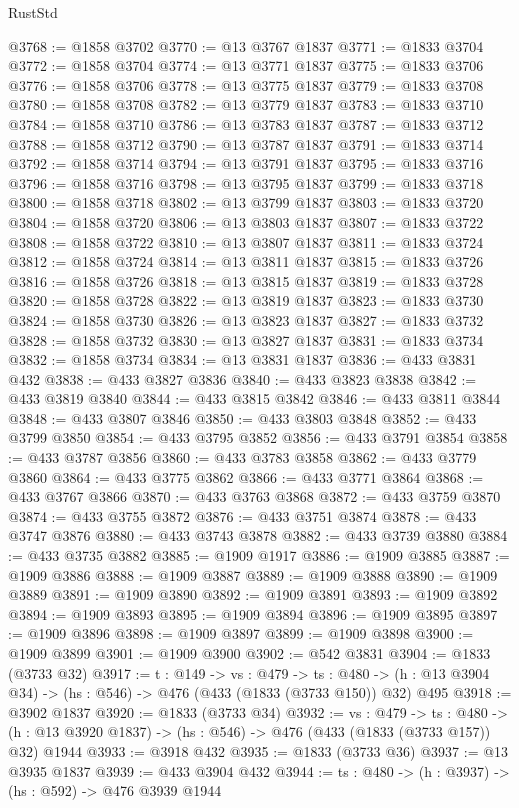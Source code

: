 \begin{lexlean}{RustStd}
\begin{coremodule}
@3768 := @1858 @3702
@3770 := @13 @3767 @1837
@3771 := @1833 @3704
@3772 := @1858 @3704
@3774 := @13 @3771 @1837
@3775 := @1833 @3706
@3776 := @1858 @3706
@3778 := @13 @3775 @1837
@3779 := @1833 @3708
@3780 := @1858 @3708
@3782 := @13 @3779 @1837
@3783 := @1833 @3710
@3784 := @1858 @3710
@3786 := @13 @3783 @1837
@3787 := @1833 @3712
@3788 := @1858 @3712
@3790 := @13 @3787 @1837
@3791 := @1833 @3714
@3792 := @1858 @3714
@3794 := @13 @3791 @1837
@3795 := @1833 @3716
@3796 := @1858 @3716
@3798 := @13 @3795 @1837
@3799 := @1833 @3718
@3800 := @1858 @3718
@3802 := @13 @3799 @1837
@3803 := @1833 @3720
@3804 := @1858 @3720
@3806 := @13 @3803 @1837
@3807 := @1833 @3722
@3808 := @1858 @3722
@3810 := @13 @3807 @1837
@3811 := @1833 @3724
@3812 := @1858 @3724
@3814 := @13 @3811 @1837
@3815 := @1833 @3726
@3816 := @1858 @3726
@3818 := @13 @3815 @1837
@3819 := @1833 @3728
@3820 := @1858 @3728
@3822 := @13 @3819 @1837
@3823 := @1833 @3730
@3824 := @1858 @3730
@3826 := @13 @3823 @1837
@3827 := @1833 @3732
@3828 := @1858 @3732
@3830 := @13 @3827 @1837
@3831 := @1833 @3734
@3832 := @1858 @3734
@3834 := @13 @3831 @1837
@3836 := @433 @3831 @432
@3838 := @433 @3827 @3836
@3840 := @433 @3823 @3838
@3842 := @433 @3819 @3840
@3844 := @433 @3815 @3842
@3846 := @433 @3811 @3844
@3848 := @433 @3807 @3846
@3850 := @433 @3803 @3848
@3852 := @433 @3799 @3850
@3854 := @433 @3795 @3852
@3856 := @433 @3791 @3854
@3858 := @433 @3787 @3856
@3860 := @433 @3783 @3858
@3862 := @433 @3779 @3860
@3864 := @433 @3775 @3862
@3866 := @433 @3771 @3864
@3868 := @433 @3767 @3866
@3870 := @433 @3763 @3868
@3872 := @433 @3759 @3870
@3874 := @433 @3755 @3872
@3876 := @433 @3751 @3874
@3878 := @433 @3747 @3876
@3880 := @433 @3743 @3878
@3882 := @433 @3739 @3880
@3884 := @433 @3735 @3882
@3885 := @1909 @1917
@3886 := @1909 @3885
@3887 := @1909 @3886
@3888 := @1909 @3887
@3889 := @1909 @3888
@3890 := @1909 @3889
@3891 := @1909 @3890
@3892 := @1909 @3891
@3893 := @1909 @3892
@3894 := @1909 @3893
@3895 := @1909 @3894
@3896 := @1909 @3895
@3897 := @1909 @3896
@3898 := @1909 @3897
@3899 := @1909 @3898
@3900 := @1909 @3899
@3901 := @1909 @3900
@3902 := @542 @3831
@3904 := @1833 (@3733 @32)
@3917 := {t : @149} ->
  {vs : @479} ->
  {ts : @480} -> (h : @13 @3904 @34) -> (hs : @546) -> @476 (@433 (@1833 (@3733 @150)) @32) @495
@3918 := @3902 @1837
@3920 := @1833 (@3733 @34)
@3932 := {vs : @479} ->
  {ts : @480} -> (h : @13 @3920 @1837) -> (hs : @546) -> @476 (@433 (@1833 (@3733 @157)) @32) @1944
@3933 := @3918 @432
@3935 := @1833 (@3733 @36)
@3937 := @13 @3935 @1837
@3939 := @433 @3904 @432
@3944 := {ts : @480} -> (h : @3937) -> (hs : @592) -> @476 @3939 @1944

\end{coremodule}
\end{lexlean}

